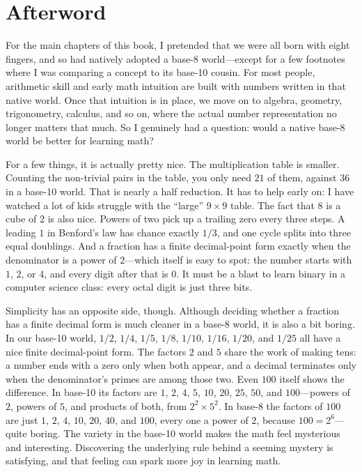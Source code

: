 \chapter{Afterword}
\label{ch:afterword}

For the main chapters of this book, I pretended that we were all born with eight fingers, and so had natively adopted a base-8 world---except for a few footnotes where I was comparing a concept to its base-10 cousin. For most people, arithmetic skill and early math intuition are built with numbers written in that native world. Once that intuition is in place, we move on to algebra, geometry, trigonometry, calculus, and so on, where the actual number representation no longer matters that much. So I genuinely had a question: would a native base-8 world be better for learning math?

For a few things, it is actually pretty nice. The multiplication table is smaller. Counting the non-trivial pairs in the table, you only need $21$ of them, against $36$ in a base-10 world. That is nearly a half reduction. It has to help early on: I have watched a lot of kids struggle with the ``large'' $9 \times 9$ table. The fact that $8$ is a cube of $2$ is also nice. Powers of two pick up a trailing zero every three steps. A leading $1$ in Benford's law has chance exactly $1/3$, and one cycle splits into three equal doublings. And a fraction has a finite decimal-point form exactly when the denominator is a power of $2$---which itself is easy to spot: the number starts with $1$, $2$, or $4$, and every digit after that is $0$. It must be a blast to learn binary in a computer science class: every octal digit is just three bits.

Simplicity has an opposite side, though. Although deciding whether a fraction has a finite decimal form is much cleaner in a base-8 world, it is also a bit boring. In our base-10 world, $1/2$, $1/4$, $1/5$, $1/8$, $1/10$, $1/16$, $1/20$, and $1/25$ all have a nice finite decimal-point form. The factors $2$ and $5$ share the work of making tens: a number ends with a zero only when both appear, and a decimal terminates only when the denominator's primes are among those two. Even $100$ itself shows the difference. In base-10 its factors are $1$, $2$, $4$, $5$, $10$, $20$, $25$, $50$, and $100$---powers of $2$, powers of $5$, and products of both, from $2^{2} \times 5^{2}$. In base-8 the factors of $100$ are just $1$, $2$, $4$, $10$, $20$, $40$, and $100$, every one a power of $2$, because $100 = 2^{6}$---quite boring. The variety in the base-10 world makes the math feel mysterious and interesting. Discovering the underlying rule behind a seeming mystery is satisfying, and that feeling can spark more joy in learning math.


